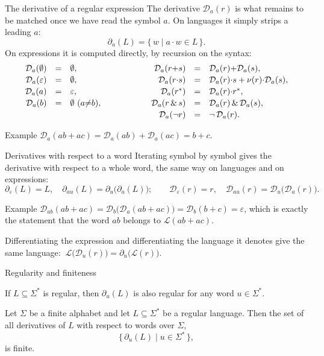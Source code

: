 \documentclass[aspectratio=169]{beamer}
\newcommand{\Dd}{\mathcal{D}}                 %
\newcommand{\eps}{\varepsilon}
\newcommand{\st}{^{*}}                         %
\begin{document}
\begin{frame}{The derivative of a regular expression}
  The derivative $\Dd_a(r)$ is what remains to be matched once we have read the
  symbol $a$. On languages it simply strips a leading $a$:
  \[
    \partial_a(L)=\{\, w \mid a\cdot w\in L \,\}.
  \]
  On expressions it is computed directly, by recursion on the syntax:
  \[
  \begin{array}{rcl@{\qquad\qquad\qquad}rcl}
    \Dd_a(\emptyset) &=& \emptyset, & \Dd_a(r{+}s) &=& \Dd_a(r){+}\Dd_a(s),\\[0.4ex]
    \Dd_a(\eps) &=& \emptyset, & \Dd_a(r{\cdot}s) &=& \Dd_a(r){\cdot}s + \nu(r){\cdot}\Dd_a(s),\\[0.4ex]
    \Dd_a(a) &=& \eps, & \Dd_a(r\st) &=& \Dd_a(r){\cdot}r\st,\\[0.4ex]
    \Dd_a(b) &=& \emptyset\ (a{\neq}b), & \Dd_a(r\,\&\,s) &=& \Dd_a(r)\,\&\,\Dd_a(s),\\[0.4ex]
    & & & \Dd_a(\neg r) &=& \neg\,\Dd_a(r).
  \end{array}
  \]
  \vfill
  \begin{block}{Example}
    $\Dd_a(ab+ac)=\Dd_a(ab)+\Dd_a(ac)=b+c$.
  \end{block}
\end{frame}

\begin{frame}{Derivatives with respect to a word}
  Iterating symbol by symbol gives the derivative with respect to a whole word,
  the same way on languages and on expressions:
  \[
    \partial_\eps(L)=L, \quad \partial_{au}(L)=\partial_u\big(\partial_a(L)\big);
    \qquad
    \Dd_\eps(r)=r, \quad \Dd_{au}(r)=\Dd_u\big(\Dd_a(r)\big).
  \]
  \vfill
  \begin{block}{Example}
    $\Dd_{ab}(ab+ac)=\Dd_b\big(\Dd_a(ab+ac)\big)=\Dd_b(b+c)=\eps$, which is
    exactly the statement that the word $ab$ belongs to $\mathcal L(ab+ac)$.
  \end{block}
  \vfill
  \begin{theorem}
    Differentiating the expression and differentiating the language it denotes
    give the same language: $\ \mathcal L\big(\Dd_u(r)\big)=\partial_u\big(\mathcal L(r)\big)$.
  \end{theorem}
\end{frame}

\begin{frame}{Regularity and finiteness}
  \begin{theorem}[Regularity]
    If $L\subseteq\Sigma^\ast$ is regular, then $\partial_u(L)$ is also regular
    for any word $u\in\Sigma^\ast$.
  \end{theorem}
  \vfill
  \begin{theorem}[Finiteness]
    Let $\Sigma$ be a finite alphabet and let $L\subseteq\Sigma^\ast$ be a
    regular language. Then the set of all derivatives of $L$ with respect to
    words over $\Sigma$,
    \[
      \{\,\partial_u(L)\mid u\in\Sigma^\ast\,\},
    \]
    is finite.
  \end{theorem}
\end{frame}
\end{document}
